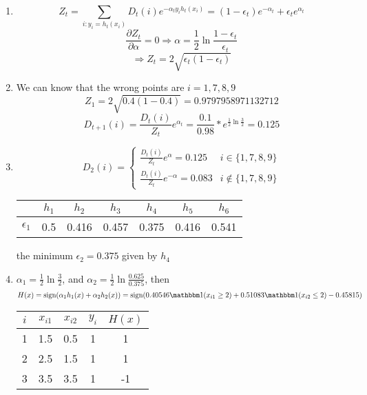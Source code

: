\documentclass[10pt]{article}
\begin{document}
\begin{enumerate}[1.]
\begin{enumerate}
\begin{enumerate}[(1)]
                \item 
                $$Z_t=\sum_{i:y_i=h_t(x_i)}D_t(i)e^{-\alpha_ty_ih_t(x_i)}=(1-\epsilon_t)e^{-\alpha_t}+\epsilon_te^{\alpha_t}$$
                $$\frac{\partial Z_t}{\partial\alpha}=0\Rightarrow\alpha=\frac{1}{2}\ln\frac{1-\epsilon_t}{\epsilon_t}$$
                $$\Rightarrow Z_t=2\sqrt{\epsilon_t(1-\epsilon_t)}$$
                \item 
                We can know that the wrong points are $i=1,7,8,9$
                $$Z_1=2\sqrt{0.4(1-0.4)}=0.9797958971132712$$
                $$D_{t+1}(i)=\frac{D_t(i)}{Z_t}e^{\alpha_t}=\frac{0.1}{0.98}*e^{\frac{1}{2}\ln\frac32}=0.125$$
                \item 
                $$D_2(i)=\left\{\begin{matrix}
                    \frac{D_t(i)}{Z_t}e^{\alpha}=0.125&i\in\{1,7,8,9\}\\
                    \frac{D_t(i)}{Z_t}e^{-\alpha}=0.083&i\not\in\{1,7,8,9\}
                \end{matrix}\right.$$
                \begin{center}
                    \begin{tabular}{|c|cccccc|}
                    \hline
                    &$h_1$&$h_2$&$h_3$&$h_4$&$h_5$&$h_6$\\
                    \hline
                    $\epsilon_1$&0.5&0.416&0.457&0.375&0.416&0.541\\
                    \hline
                    \end{tabular}
                \end{center}
                the minimum $\epsilon_2=0.375$ given by $h_4$\newpage
                \item 
                $\alpha_1=\frac{1}{2}\ln\frac32$, and $\alpha_2=\frac12\ln\frac{0.625}{0.375}$, then $$H(x)=\mbox{sign}(\alpha_1h_1(x)+\alpha_2h_2(x))=\mbox{sign}(0.40546\mathbbm1(x_{i1}\geq2)+0.51083\mathbbm1(x_{i2}\leq2)-0.45815)$$
                \begin{center}
                    \begin{tabular}{|c|cc|c|c|}
                        \hline
                        $i$ & $x_{i1}$ & $x_{i2}$ & $y_{i}$ & $H(x)$\\ \hline
                        1 & 1.5 & 0.5 & 1 &1\\
                        2 & 2.5 & 1.5 & 1 &1\\
                        3 & 3.5 & 3.5 & 1 &-1\\

\end{tabular}
\end{center}
\end{enumerate}
\end{enumerate}
\end{enumerate}
\end{document}
